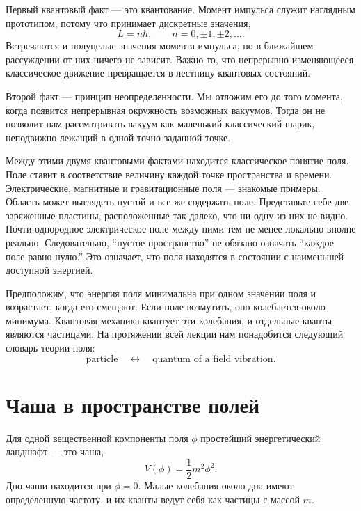 Первый квантовый факт — это квантование. Момент импульса служит наглядным прототипом, потому что принимает дискретные значения,
\begin{equation}
L=n\hbar,
\qquad
n=0,\pm1,\pm2,\ldots .
\end{equation}
Встречаются и полуцелые значения момента импульса, но в ближайшем рассуждении от них ничего не зависит. Важно то, что непрерывно изменяющееся классическое движение превращается в лестницу квантовых состояний.

Второй факт — принцип неопределенности. Мы отложим его до того момента, когда появится непрерывная окружность возможных вакуумов. Тогда он не позволит нам рассматривать вакуум как маленький классический шарик, неподвижно лежащий в одной точно заданной точке.

Между этими двумя квантовыми фактами находится классическое понятие поля. Поле ставит в соответствие величину каждой точке пространства и времени. Электрические, магнитные и гравитационные поля — знакомые примеры. Область может выглядеть пустой и все же содержать поле. Представьте себе две заряженные пластины, расположенные так далеко, что ни одну из них не видно. Почти однородное электрическое поле между ними тем не менее локально вполне реально. Следовательно, ``пустое пространство'' не обязано означать ``каждое поле равно нулю.'' Это означает, что поля находятся в состоянии с наименьшей доступной энергией.

Предположим, что энергия поля минимальна при одном значении поля и возрастает, когда его смещают. Если поле возмутить, оно колеблется около минимума. Квантовая механика квантует эти колебания, и отдельные кванты являются частицами. На протяжении всей лекции нам понадобится следующий словарь теории поля:
\begin{equation}
\text{particle}
\quad\longleftrightarrow\quad
\text{quantum of a field vibration}.
\end{equation}

\section{Чаша в пространстве полей}

Для одной вещественной компоненты поля $\phi$ простейший энергетический ландшафт — это чаша,
\begin{equation}
V(\phi)=\frac{1}{2}m^{2}\phi^{2}.
\end{equation}
Дно чаши находится при $\phi=0$. Малые колебания около дна имеют определенную частоту, и их кванты ведут себя как частицы с массой $m$.

